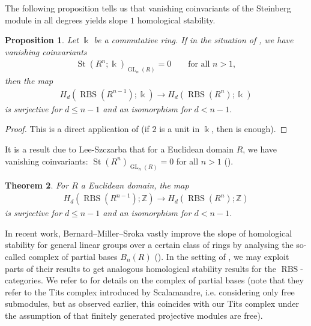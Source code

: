 \documentclass[12pt, reqno]{amsart}
\theoremstyle{plain}
\newtheorem{theorem}{Theorem}[section]
\newtheorem{proposition}[theorem]{Proposition}
\theoremstyle{definition}
\newcommand{\Z}{\mathbb Z}
\begin{document}
The following proposition tells us that vanishing coinvariants of the Steinberg module in all degrees yields slope $1$ homological stability.

\begin{proposition}\label{improved homological stability}
Let $\Bbbk$ be a commutative ring. If in the situation of , we have vanishing coinvariants
\begin{align*}
\operatorname{St}(R^n; \Bbbk)_{\operatorname{GL}_n(R)}=0\qquad\text{for all }n>1,
\end{align*}
then the map
\begin{align*}
H_d(\operatorname{RBS}(R^{n-1}); \Bbbk)\longrightarrow H_d(\operatorname{RBS}(R^n); \Bbbk)
\end{align*}
is surjective for $d\leq n-1$ and an isomorphism for $d< n-1$.
\end{proposition}
\begin{proof}
This is a direct application of \cite[Theorem 1]{JansenMiller} (if $2$ is a unit in $\Bbbk$, then \cite[Proposition 5.1]{KupersMillerPatzt} is enough).
\end{proof}

It is a result due to Lee-Szczarba that for a Euclidean domain $R$, we have vanishing coinvariants: $\operatorname{St}(R^n)_{\operatorname{GL}_n(R)}=0$ for all $n>1$ (\cite[Theorem 1.3]{LeeSzczarba}).

\begin{theorem}\label{Euclidean domain homological stability}
For $R$ a Euclidean domain, the map
\begin{align*}
H_d(\operatorname{RBS}(R^{n-1}); \Z)\longrightarrow H_d(\operatorname{RBS}(R^n); \Z)
\end{align*}
is surjective for $d\leq n-1$ and an isomorphism for $d< n-1$.
\end{theorem}

In recent work, Bernard--Miller--Sroka vastly improve the slope of homological stability for general linear groups over a certain class of rings by analysing the so-called complex of partial bases $B_n(R)$ (\cite{BernardMillerSroka}). In the setting of , we may exploit parts of their results to get analogous homological stability results for the $\operatorname{RBS}$-categories. We refer to \cite{BernardMillerSroka} for details on the complex of partial bases (note that they refer to the Tits complex introduced by Scalamandre, i.e. considering only free submodules, but as observed earlier, this coincides with our Tits complex under the assumption of  that finitely generated projective modules are free).
\end{document}
